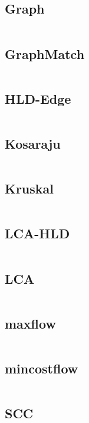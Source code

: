 \documentclass[a4]{article}
\begin{document}
\subsection{Graph}
\inputminted[mathescape,linenos,numbersep=5pt,frame=lines,framesep=2mm]{cpp}{src/graph/Graph.cpp}
\subsection{GraphMatch}
\inputminted[mathescape,linenos,numbersep=5pt,frame=lines,framesep=2mm]{cpp}{src/graph/GraphMatch.cpp}
\subsection{HLD-Edge}
\inputminted[mathescape,linenos,numbersep=5pt,frame=lines,framesep=2mm]{cpp}{src/graph/HLD-Edge.cpp}
\subsection{Kosaraju}
\inputminted[mathescape,linenos,numbersep=5pt,frame=lines,framesep=2mm]{cpp}{src/graph/Kosaraju.cpp}
\subsection{Kruskal}
\inputminted[mathescape,linenos,numbersep=5pt,frame=lines,framesep=2mm]{cpp}{src/graph/Kruskal.cpp}
\subsection{LCA-HLD}
\inputminted[mathescape,linenos,numbersep=5pt,frame=lines,framesep=2mm]{cpp}{src/graph/LCA-HLD.cpp}
\subsection{LCA}
\inputminted[mathescape,linenos,numbersep=5pt,frame=lines,framesep=2mm]{cpp}{src/graph/LCA.cpp}
\subsection{maxflow}
\inputminted[mathescape,linenos,numbersep=5pt,frame=lines,framesep=2mm]{cpp}{src/graph/maxflow.cpp}
\subsection{mincostflow}
\inputminted[mathescape,linenos,numbersep=5pt,frame=lines,framesep=2mm]{cpp}{src/graph/mincostflow.cpp}
\subsection{SCC}
\inputminted[mathescape,linenos,numbersep=5pt,frame=lines,framesep=2mm]{cpp}{src/graph/SCC.cpp}
\end{document}
